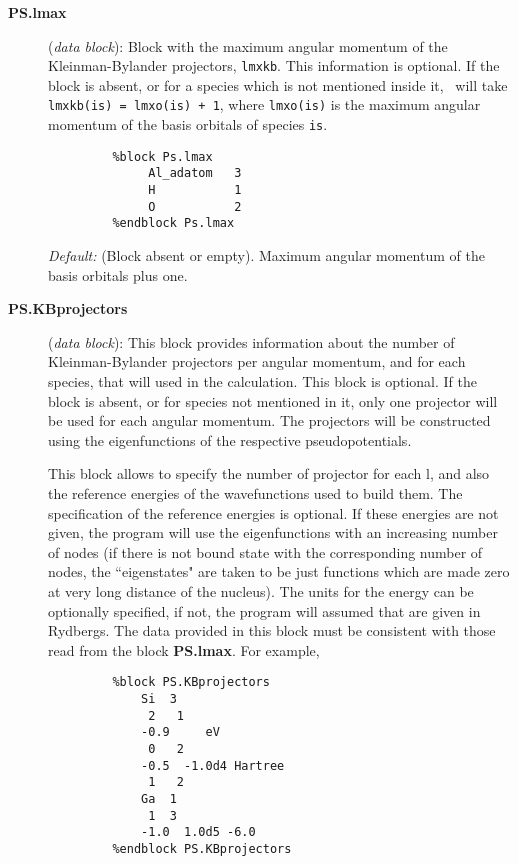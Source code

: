 \begin{description}

\item[\textbf{PS.lmax}]  (\textit{data block}):
Block with the maximum angular momentum of the Kleinman-Bylander
projectors, \texttt{lmxkb}.
This information is optional. If the block
is absent, or for a species which is not mentioned inside
it, \siesta\ will take \texttt{lmxkb(is) = lmxo(is) + 1}, where \texttt{lmxo(is)}
is the maximum angular momentum of the basis orbitals of species \texttt{is}.
\begin{verbatim}
         %block Ps.lmax
              Al_adatom   3
              H           1
              O           2
         %endblock Ps.lmax
\end{verbatim}
\textit{Default:} (Block absent or empty). Maximum angular momentum
of the basis orbitals plus one.
\noindent

\item[\textbf{PS.KBprojectors}] (\textit{data block}):
This block provides information about the number of Kleinman-Bylander
projectors per angular momentum, and for each species, that will used
in the calculation. This block is optional.
If the block is absent, or for species not mentioned in it, only
one projector will be used for each angular momentum. The projectors
will be constructed using the eigenfunctions of the respective
pseudopotentials.


This block allows to specify the number of projector for each l, and also
the reference energies of the wavefunctions used to build them.
The specification of the reference energies is optional. If these
energies are not given, the program will use the eigenfunctions with an
increasing number of nodes (if there is not bound state with
the corresponding number of nodes, the ``eigenstates" are taken to be just
functions which are made zero at very long distance of the nucleus).
The units for the energy can be optionally specified, if not, the
program will assumed that are given in Rydbergs.
The data provided in this block must be consistent with those
read from the block \textbf{PS.lmax}. For example,

\begin{verbatim}
         %block PS.KBprojectors
             Si  3
              2   1
             -0.9     eV
              0   2
             -0.5  -1.0d4 Hartree
              1   2
             Ga  1
              1  3
             -1.0  1.0d5 -6.0
         %endblock PS.KBprojectors
\end{verbatim}


\end{description}
